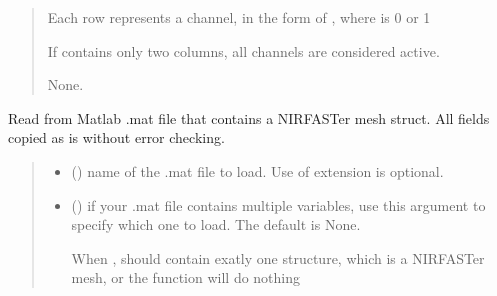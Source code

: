 \documentclass[letterpaper,10pt,english]{sphinxmanual}
\begin{document}
\begin{fulllineitems}
\begin{fulllineitems}
\begin{quote}
\begin{description}
\begin{itemize}
\sphinxAtStartPar
Each row represents a channel, in the form of , where  is 0 or 1

\sphinxAtStartPar
If  contains only two columns, all channels are considered active.


\end{itemize}

\sphinxAtStartPar
None.

\end{description}\end{quote}

\end{fulllineitems}


\begin{fulllineitems}
\label{\detokenize{_autosummary/nirfasterff.base.fluor_mesh.fluormesh:nirfasterff.base.fluor_mesh.fluormesh.from_mat}}
\pysigstartsignatures
\pysiglinewithargsret
{}
{\sphinxparamcomma {}}
{}
\pysigstopsignatures
\sphinxAtStartPar
Read from Matlab .mat file that contains a NIRFASTer mesh struct. All fields copied as is without error checking.
\begin{quote}\begin{description}
\begin{itemize}
\item {} 
\sphinxAtStartPar
{} () \textendash{} name of the .mat file to load. Use of extension is optional.

\item {} 
\sphinxAtStartPar
{} (\sphinxstyleliteralemphasis{\sphinxupquote{, }}) \textendash{} 
\sphinxAtStartPar
if your .mat file contains multiple variables, use this argument to specify which one to load. The default is None.

\sphinxAtStartPar
When ,  should contain exatly one structure, which is a NIRFASTer mesh, or the function will do nothing



\end{itemize}
\end{description}
\end{quote}
\end{fulllineitems}
\end{fulllineitems}
\end{document}
